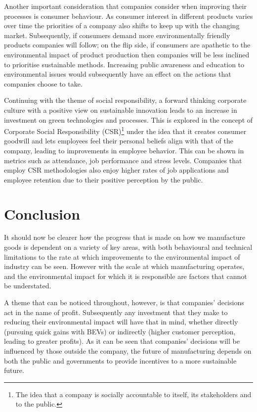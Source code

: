 \documentclass[11pt,a4paper]{article}
\begin{document}
Another important consideration that companies consider when improving their processes is consumer behaviour. As consumer interest in different products varies over time the priorities of a company also shifts to keep up with the changing market. Subsequently, if consumers demand more environmentally friendly products companies will follow; on the flip side, if consumers are apathetic to the environmental impact of product production then companies will be less inclined to prioritise sustainable methods\cite{buell2021transparency}. Increasing public awareness and education to environmental issues would subsequently have an effect on the actions that companies choose to take.

Continuing with the theme of social responsibility, a forward thinking corporate culture with a positive view on sustainable innovation leads to an increase in investment on green technologies and processes. This is explored in the concept of Corporate Social Responsibility (CSR)\footnote{The idea that a company is socially accountable to itself, its stakeholders and to the public.} under the idea that it creates consumer goodwill and lets employees feel their personal beliefs align with that of the company, leading to improvements in employee behavior. This can be shown in metrics such as attendance, job performance and stress levels. Companies that employ CSR methodologies also enjoy higher rates of job applications and employee retention due to their positive perception by the public\cite{brammer2007contribution}.



\section{Conclusion}

It should now be clearer how the progress that is made on how we manufacture goods is dependent on a variety of key areas, with both behavioural and technical limitations to the rate at which improvements to the environmental impact of industry can be seen. However with the scale at which manufacturing operates, and the environmental impact for which it is responsible are factors that cannot be understated.

A theme that can be noticed throughout, however, is that companies' decisions act in the name of profit. Subsequently any investment that they make to reducing their environmental impact will have that in mind, whether directly (pursuing quick gains with BEVs) or indirectly (higher customer perception, leading to greater profits). As it can be seen that companies' decisions will be influenced by those outside the company, the future of manufacturing depends on both the public and governments to provide incentives to a more sustainable future. 


\printbibliography
\end{document}
